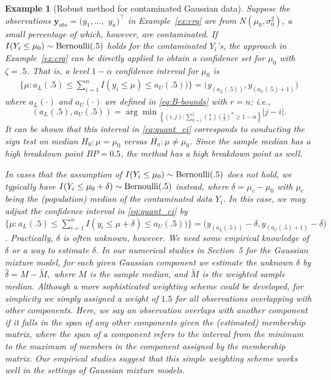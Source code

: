 \documentclass[12pt]{article}
\theoremstyle{shortspace}
\newtheorem{example}{\quad Example}
\def\*#1{\bm{#1}}
\begin{document}
\begin{example}[Robust method for contaminated Gaussian data]
\label{ex:crq_robust}
Suppose the observations $\*y_{obs} =(y_1, \ldots,$ $ y_n)^\top$ in Example~\ref{ex:crq} are from
$N(\mu_0, \sigma_0^2)$, a small percentage of which, however, are contaminated. If $I(Y_i \leq \mu_0) 
\sim {\rm Bernoulli}(.5)$ holds for the contaminated $Y_i$'s, the approach in Example~\ref{ex:crq} can be directly applied to obtain a confidence set 
for $\mu_0$ with $\zeta = .5$.  That is, a level $1 - \alpha$ confidence interval for $\mu_0$ is
\begin{align}
\big\{\mu: a_L(.5) \leq \sum_{i = 1}^n I(y_i \leq \mu) \leq a_U(.5))
\big\} = \big(y_{(a_L(.5))}, y_{(a_U(.5)+1)}\big)
\label{eq:quant_ci}
\end{align}
where $a_L(\cdot)$ and $a_U(\cdot)$ are defined  in \eqref{eq:B-bounds} with $r = n$; i.e.,
$$
\left(a_L(.5), a_U(.5)\right) = 
{\arg\min}_{\left\{(i,j): \sum^j_{k=i} {n \choose k} \left(\frac12\right)^n \geq 1- \alpha \right\}}
    |j-i|. 
$$
It can be shown that this interval in \eqref{eq:quant_ci} corresponds to conducting the sign test on median $H_0: \mu = \mu_0$ versus $H_a: \mu \not= \mu_0$. Since the sample median has a high breakdown point $BP = 0.5$, the method has a high breakdown point as well.  




In cases that 
the assumption of $I(Y_i \leq \mu_0) %
\sim {\rm Bernoulli}(.5)$ does not hold, 
we typically have 
$I(Y_i \leq \mu_0 + \delta) %
\sim {\rm Bernoulli}(.5)$ instead, where $\delta = \mu_c - \mu_0$ with $\mu_c$ being the (population) median of the contaminated data $Y_i$.  
In this case, 
we may 
adjust the confidence interval in \eqref{eq:quant_ci} by  $\big\{\mu: a_L(.5) \leq \sum_{i = 1}^n I(y_i \leq \mu + \delta) \leq a_U(.5))
\big\} = \big(y_{(a_L(.5))} - \delta, y_{(a_U(.5)+1)} -\delta\big)$. 
Practically, $\delta$ is often unknown, however. We need some empirical knowledge of $\delta$ or a way to estimate 
$\delta$. 
In our numerical studies in Section~5  
for the Gaussian mixture model, for each given Gaussian component we estimate the unknown $\delta$ by $\hat \delta = M - \widetilde M,$ where $M$ is the sample median, and $\widetilde M$ is the weighted sample median.  
Although a more sophisticated weighting scheme could be developed, for simplicity we simply assigned a weight of $1.5$ for all observations overlapping with other components. Here, we say an observation overlaps with another component if it falls in the span of any other components given the (estimated) membership matrix, where the span of a  component refers to the interval from the minimum to the maximum of 
members in
the component assigned by the membership matrix.
Our empirical studies suggest that this simple weighting scheme works well in the settings of Gaussian mixture models. 





\end{example}
\end{document}
